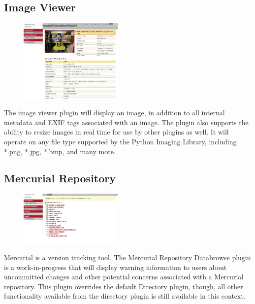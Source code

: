 \documentclass[10pt]{article}
\begin{document}
\subsection{Image Viewer}
\begin{figure}
		\includegraphics[width=0.45\textwidth]{Image_Viewer.png}
\end{figure}
The image viewer plugin will display an image, in addition to all internal metadata and EXIF tags associated with an image.  The plugin also supports the ability to resize images in real time for use by other plugins as well.  It will operate on any file type supported by the Python Imaging Library, including *.png, *.jpg, *.bmp, and many more.

\endgroup

\hfill \break
\hfill \break
\hfill \break
\hfill \break
\hfill \break
\hfill \break
\hfill \break

\begingroup
\setlength\intextsep{0pt}
\subsection{Mercurial Repository}
\begin{figure}
		\includegraphics[width=0.45\textwidth]{Mercurial_Repository.png}
\end{figure}
Mercurial is a version tracking tool.  The Mercurial Repository Databrowse plugin is a work-in-progress that will display warning information to users about uncommitted changes and other potential concerns associated with a Mercurial repository.  This plugin overrides the default Directory plugin, though, all other functionality available from the directory plugin is still available in this context.
\end{document}
